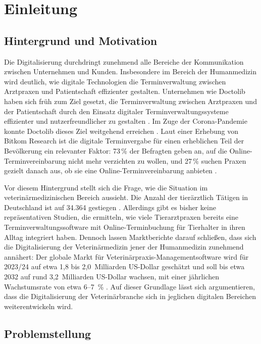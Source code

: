 \chapter{Einleitung}
\label{chap:einleitung}

\section{Hintergrund und Motivation}

Die Digitalisierung durchdringt zunehmend alle Bereiche der Kommunikation zwischen Unternehmen und Kunden. Insbesondere im Bereich der Humanmedizin wird deutlich, wie digitale Technologien die Terminverwaltung zwischen Arztpraxen und Patientschaft effizienter gestalten. Unternehmen wie Doctolib haben sich früh zum Ziel gesetzt, die Terminverwaltung zwischen Arztpraxen und der Patientschaft durch den Einsatz digitaler Terminverwaltungssysteme effizienter und nutzerfreundlicher zu gestalten \cite{doctolibreport}. Im Zuge der Corona-Pandemie konnte Doctolib dieses Ziel weitgehend erreichen \cite{doctolibreport}. Laut einer Erhebung von Bitkom Research ist die digitale Terminvergabe für einen erheblichen Teil der Bevölkerung ein relevanter Faktor: 73\,\% der Befragten geben an, auf die Online-Terminvereinbarung nicht mehr verzichten zu wollen, und 27\,\% suchen Praxen gezielt danach aus, 
ob sie eine Online-Terminvereinbarung anbieten \cite{bitkom2024}.

Vor diesem Hintergrund stellt sich die Frage, wie die Situation im veterinärmedizinischen Bereich aussieht. Die Anzahl der tierärztlich Tätigen in Deutschland ist auf 34.364 gestiegen \cite{btk2025}. Allerdings gibt es bisher keine repräsentativen Studien, die ermitteln, wie viele Tierarztpraxen bereits eine Terminverwaltungssoftware mit Online-Terminbuchung für Tierhalter in ihren Alltag integriert haben. Dennoch lassen Marktberichte darauf schließen, dass sich die Digitalisierung der Veterinärmedizin jener der Humanmedizin zunehmend annähert: Der globale Markt für Veterinärpraxis-Managementsoftware wird für 2023/24 auf etwa 1,8 bis 2,0~Milliarden US-Dollar geschätzt und soll bis etwa 2032 auf rund 3,2~Milliarden US-Dollar wachsen, mit einer jährlichen Wachstumsrate von etwa 6--7~\% \cite{vsmreport}. Auf dieser Grundlage lässt sich argumentieren, dass die Digitalisierung der Veterinärbranche sich in jeglichen digitalen Bereichen weiterentwickeln wird.

\section{Problemstellung}

